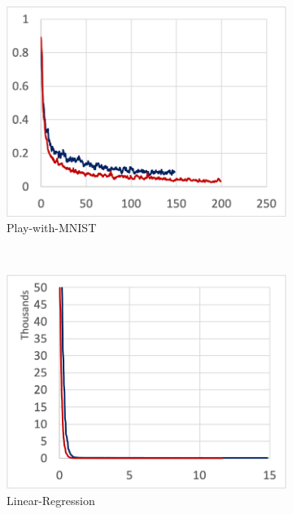 \begin{figure}[!ht]
  \begin{subfigure}[t]{.24\textwidth}
    \includegraphics[width=\textwidth]{tf2-03}
    \caption{Play-with-MNIST}
  \end{subfigure}
  ~
  \begin{subfigure}[t]{.24\textwidth}
    \includegraphics[width=\textwidth]{tf2-04}
    \caption{Linear-Regression}
  \end{subfigure} 
  ~ 
  \begin{subfigure}[t]{.24\textwidth}

\end{subfigure}
\end{figure}
